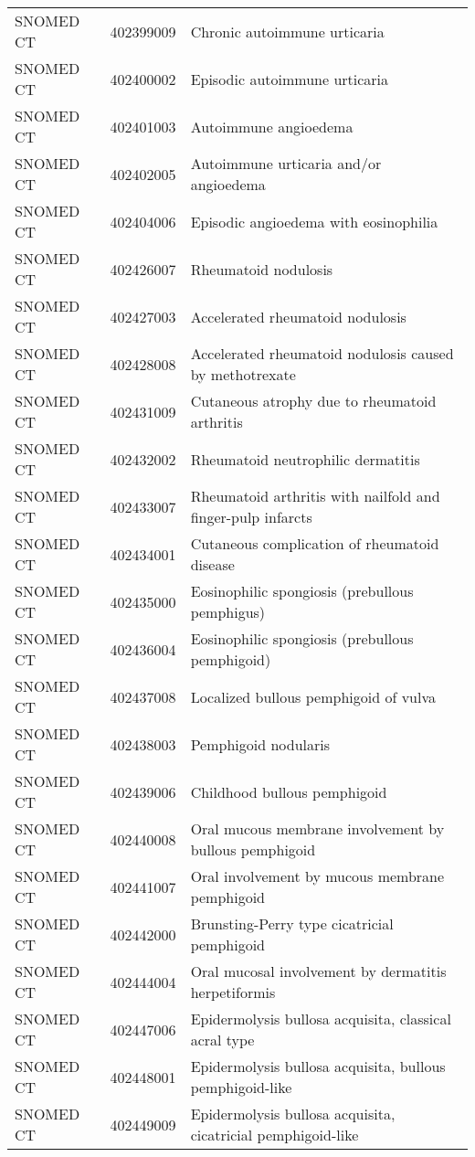 \begin{longtable}{p{}p{}p{}}
  SNOMED CT & 402399009 & Chronic autoimmune urticaria \\ 
  SNOMED CT & 402400002 & Episodic autoimmune urticaria \\ 
  SNOMED CT & 402401003 & Autoimmune angioedema \\ 
  SNOMED CT & 402402005 & Autoimmune urticaria and/or angioedema \\ 
  SNOMED CT & 402404006 & Episodic angioedema with eosinophilia \\ 
  SNOMED CT & 402426007 & Rheumatoid nodulosis \\ 
  SNOMED CT & 402427003 & Accelerated rheumatoid nodulosis \\ 
  SNOMED CT & 402428008 & Accelerated rheumatoid nodulosis caused by methotrexate \\ 
  SNOMED CT & 402431009 & Cutaneous atrophy due to rheumatoid arthritis \\ 
  SNOMED CT & 402432002 & Rheumatoid neutrophilic dermatitis \\ 
  SNOMED CT & 402433007 & Rheumatoid arthritis with nailfold and finger-pulp infarcts \\ 
  SNOMED CT & 402434001 & Cutaneous complication of rheumatoid disease \\ 
  SNOMED CT & 402435000 & Eosinophilic spongiosis (prebullous pemphigus) \\ 
  SNOMED CT & 402436004 & Eosinophilic spongiosis (prebullous pemphigoid) \\ 
  SNOMED CT & 402437008 & Localized bullous pemphigoid of vulva \\ 
  SNOMED CT & 402438003 & Pemphigoid nodularis \\ 
  SNOMED CT & 402439006 & Childhood bullous pemphigoid \\ 
  SNOMED CT & 402440008 & Oral mucous membrane involvement by bullous pemphigoid \\ 
  SNOMED CT & 402441007 & Oral involvement by mucous membrane pemphigoid \\ 
  SNOMED CT & 402442000 & Brunsting-Perry type cicatricial pemphigoid \\ 
  SNOMED CT & 402444004 & Oral mucosal involvement by dermatitis herpetiformis \\ 
  SNOMED CT & 402447006 & Epidermolysis bullosa acquisita, classical acral type \\ 
  SNOMED CT & 402448001 & Epidermolysis bullosa acquisita, bullous pemphigoid-like \\ 
  SNOMED CT & 402449009 & Epidermolysis bullosa acquisita, cicatricial pemphigoid-like \\ 

\end{longtable}
